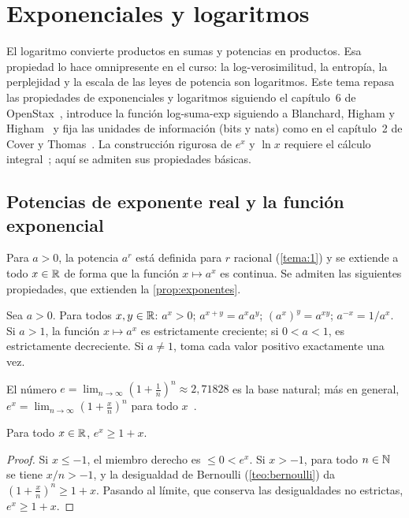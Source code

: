 \chapter{Exponenciales y logaritmos}
\label{tema:5}

El logaritmo convierte productos en sumas y potencias en productos. Esa propiedad lo hace omnipresente en el curso: la log-verosimilitud, la entropía, la perplejidad y la escala de las leyes de potencia son logaritmos. Este tema repasa las propiedades de exponenciales y logaritmos siguiendo el capítulo~6 de OpenStax~\cite{openstax}, introduce la función log-suma-exp siguiendo a Blanchard, Higham y Higham~\cite{blanchard} y fija las unidades de información (bits y nats) como en el capítulo~2 de Cover y Thomas~\cite{ct}. La construcción rigurosa de $e^x$ y $\ln x$ requiere el cálculo integral~\cite[cap.~18]{spivak}; aquí se admiten sus propiedades básicas.

\section{Potencias de exponente real y la función exponencial}

Para $a>0$, la potencia $a^r$ está definida para $r$ racional (\cref{tema:1}) y se extiende a todo $x\in\mathbb{R}$ de forma que la función $x\mapsto a^x$ es continua. Se admiten las siguientes propiedades, que extienden la \cref{prop:exponentes}.

\begin{proposicion}\label{prop:exp}
Sea $a>0$. Para todos $x,y\in\mathbb{R}$: $a^x>0$; $a^{x+y}=a^xa^y$; $(a^x)^y=a^{xy}$; $a^{-x}=1/a^x$. Si $a>1$, la función $x\mapsto a^x$ es estrictamente creciente; si $0<a<1$, es estrictamente decreciente. Si $a\neq1$, toma cada valor positivo exactamente una vez.
\end{proposicion}

El número $e=\lim_{n\to\infty}(1+\frac1n)^n\approx2{,}71828$ es la base natural; más en general, $e^x=\lim_{n\to\infty}(1+\frac xn)^n$ para todo $x$~\cite[cap.~18]{spivak}.

\begin{proposicion}\label{prop:ex-cota}
Para todo $x\in\mathbb{R}$, $e^x\ge1+x$.
\end{proposicion}

\begin{proof}
Si $x\le-1$, el miembro derecho es $\le0<e^x$. Si $x>-1$, para todo $n\in\mathbb{N}$ se tiene $x/n>-1$, y la desigualdad de Bernoulli (\cref{teo:bernoulli}) da $(1+\frac xn)^n\ge1+x$. Pasando al límite, que conserva las desigualdades no estrictas, $e^x\ge1+x$.
\end{proof}

